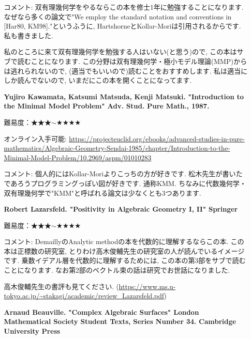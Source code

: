 コメント: 双有理幾何学をやるならこの本を修士1年に勉強することになります. なぜなら多くの論文で"We employ the standard notation and conventions in [Har80, KM98]."というふうに, HartshorneとKollar-Moriは引用されるからです. 私も書きました. 

私のところに来て双有理幾何学を勉強する人はいない(と思う)ので, この本はサブで読むことになります. 
 この分野は双有理幾何学・極小モデル理論(MMP)からは逃れられないので, (適当でもいいので)読むことをおすすめします. 私は適当にしか読んでないので, いまだにこの本を開くことになってます. 
 \vspace{8pt}
 
 \textbf{Yujiro Kawamata, Katsumi Matsuda, Kenji Matsuki. "Introduction to the Minimal Model Problem" Adv. Stud. Pure Math., 1987. } \vspace{-6pt}

難易度：★★★$\sim$★★★★\vspace{-6pt} 

オンライン入手可能: 
\url{https://projecteuclid.org/ebooks/advanced-studies-in-pure-mathematics/Algebraic-Geometry-Sendai-1985/chapter/Introduction-to-the-Minimal-Model-Problem/10.2969/aspm/01010283} 
\vspace{-6pt}

コメント: 個人的にはKollar-Moriよりこっちの方が好きです. 松木先生が書いたであろうプログラミングっぽい図が好きです. 通称KMM. ちなみに代数幾何学・双有理幾何学で"KMM"と呼ばれる論文は少なくとも3つあります. 
\vspace{8pt}

\textbf{Robert Lazarsfeld. "Positivity in Algebraic Geometry I, II" Springer} \vspace{-6pt}

難易度：★★★$\sim$★★★★\vspace{-6pt} 

コメント: DemaillyのAnalytic methodの本を代数的に理解するならこの本. この本は正標数の研究室, とりわけ高木俊輔先生の研究室の人が読んでいるイメージです. 乗数イデアル層を代数的に理解するためには, この本の第3部をサブで読むことになります. なお第2部のベクトル束の話は研究でお世話になりました. 

高木俊輔先生の書評も見てください. (\url{https://www.ms.u-tokyo.ac.jp/~stakagi/academic/review_Lazarsfeld.pdf})
\vspace{8pt}


\textbf{Arnaud Beauville. "Complex Algebraic Surfaces" London Mathematical Society Student Texts, Series Number 34. Cambridge University Press} \vspace{-6pt}

